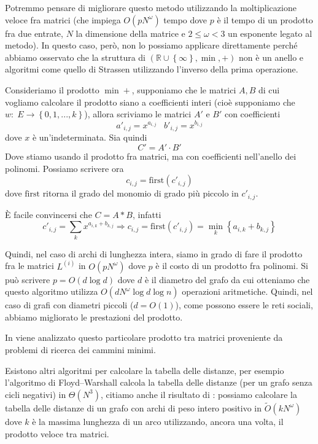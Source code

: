 \documentclass[a4paper,10pt]{amsbook}
\theoremstyle{plain}
\theoremstyle{definition}
\theoremstyle{remark}
\newcommand{\set}[1]{\left\{#1\right\}}
\newcommand{\pa}[1]{\left(#1\right)}
\begin{document}
Potremmo pensare di migliorare questo metodo utilizzando la
moltiplicazione veloce fra matrici (che impiega $O\pa{pN^\omega}$
tempo dove $p$ è il tempo di un prodotto fra due entrate, $N$ la
dimensione della matrice e $2 \le \omega <3$ un esponente legato al
metodo). In questo caso, però, non lo possiamo applicare direttamente
perché abbiamo osservato che la struttura di $\pa{ \mathbb{R} \cup
  \set{\infty}, \min , +}$ non è un anello e algoritmi come quello di
Strassen utilizzando l'inverso della prima operazione.

Consideriamo il prodotto $\min +$, supponiamo che le matrici $A,B$ di
cui vogliamo calcolare il prodotto siano a coefficienti interi (cio\`e
supponiamo che $w:\; E \to \set{0, 1,...,k}$), allora scriviamo le
matrici $A'$ e $B'$ con coefficienti
\[ a'_{i,j} = x ^{a_{i,j}} \;\;\; b'_{i,j} = x ^{b_{i,j}} \]
dove $x$ è un'indeterminata. Sia quindi
\[ C' = A' \cdot B' \]
Dove stiamo usando il prodotto fra matrici, ma con coefficienti
nell'anello dei polinomi. Possiamo scrivere ora 
\[ c _{i,j} = \mathrm{first}\pa{c'_{i,j}} \]
dove $\mathrm{first}$ ritorna il grado del monomio di grado più
piccolo in $c'_{i,j}$.

È facile convincersi che $C = A * B$, infatti 
\[ c'_{i,j} = \sum _k x^{a_{i,k} + b_{k,j}} \Rightarrow c_{i,j} =
\mathrm{first} \pa{c'_{i,j}} = \min _k \set{ a_{i,k} + b_{k,j} } \]

Quindi, nel caso di archi di lunghezza intera, siamo in grado di fare
il prodotto fra le matrici $L^{(i)}$ in $O\pa{pN^\omega }$ dove $p$ è
il costo di un prodotto fra polinomi. Si pu\`o scrivere $p = O\pa{d
  \log d}$ dove $d$ \`e il diametro del grafo da cui otteniamo che
questo algoritmo utilizza $O\pa{ d N ^\omega \log d \log n}$
operazioni aritmetiche. Quindi, nel caso di grafi con diametri
piccoli ($d = O(1)$), come possono essere le reti sociali, abbiamo
migliorato le prestazioni del prodotto.

In \cite{funnymult} viene analizzato questo particolare prodotto tra
matrici proveniente da problemi di ricerca dei cammini minimi.


Esistono altri algoritmi per calcolare la tabella delle distanze, per
esempio l'algoritmo di Floyd–Warshall calcola la tabella delle
distanze (per un grafo senza cicli negativi) in $\Theta\pa{ N^3}$,
citiamo anche il risultato di \cite{apspfmp}: possiamo calcolare la
tabella delle distanze di un grafo con archi di peso intero positivo
in $\tilde O\pa{ kN^\omega}$ dove $k$ è la massima lunghezza di un
arco utilizzando, ancora una volta, il prodotto veloce tra matrici.
\end{document}
